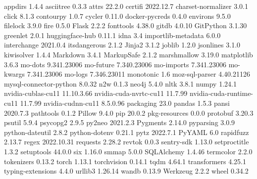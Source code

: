 appdirs                  1.4.4      
asciitree                0.3.3      
attrs                    22.2.0     
certifi                  2022.12.7  
charset-normalizer       3.0.1      
click                    8.1.3      
contourpy                1.0.7      
cycler                   0.11.0     
docker-pycreds           0.4.0      
environs                 9.5.0      
filelock                 3.9.0      
fire                     0.5.0      
Flask                    2.2.2      
fonttools                4.38.0     
gitdb                    4.0.10     
GitPython                3.1.30     
greenlet                 2.0.1      
huggingface-hub          0.11.1     
idna                     3.4        
importlib-metadata       6.0.0      
interchange              2021.0.4   
itsdangerous             2.1.2      
Jinja2                   3.1.2      
joblib                   1.2.0      
jsonlines                3.1.0      
kiwisolver               1.4.4      
Markdown                 3.4.1      
MarkupSafe               2.1.2      
marshmallow              3.19.0     
matplotlib               3.6.3      
mo-dots                  9.341.23006
mo-future                7.340.23006
mo-imports               7.341.23006
mo-kwargs                7.341.23006
mo-logs                  7.346.23011
monotonic                1.6        
moz-sql-parser           4.40.21126 
mysql-connector-python   8.0.32     
n2w                      0.1.3      
neo4j                    5.4.0      
nltk                     3.8.1      
numpy                    1.24.1     
nvidia-cublas-cu11       11.10.3.66 
nvidia-cuda-nvrtc-cu11   11.7.99    
nvidia-cuda-runtime-cu11 11.7.99    
nvidia-cudnn-cu11        8.5.0.96   
packaging                23.0       
pandas                   1.5.3      
pansi                    2020.7.3   
pathtools                0.1.2      
Pillow                   9.4.0      
pip                      20.0.2     
pkg-resources            0.0.0      
protobuf                 3.20.3     
psutil                   5.9.4      
psycopg2                 2.9.5      
py2neo                   2021.2.3   
Pygments                 2.14.0     
pyparsing                3.0.9      
python-dateutil          2.8.2      
python-dotenv            0.21.1     
pytz                     2022.7.1   
PyYAML                   6.0        
rapidfuzz                2.13.7     
regex                    2022.10.31 
requests                 2.28.2     
revtok                   0.0.3      
sentry-sdk               1.13.0     
setproctitle             1.3.2      
setuptools               44.0.0     
six                      1.16.0     
smmap                    5.0.0      
SQLAlchemy               1.4.46     
termcolor                2.2.0      
tokenizers               0.13.2     
torch                    1.13.1     
torchvision              0.14.1     
tqdm                     4.64.1     
transformers             4.25.1     
typing-extensions        4.4.0      
urllib3                  1.26.14    
wandb                    0.13.9     
Werkzeug                 2.2.2      
wheel                    0.34.2 